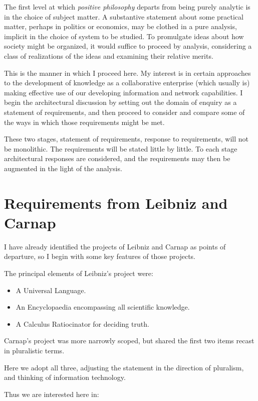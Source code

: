 The first level at which \emph{positive philosophy} departs from being
purely analytic is in the choice of subject matter.
A substantive statement about some practical matter, perhaps in
politics or economics, may be clothed in a pure analysis, implicit in
the choice of system to be studied.
To promulgate ideas about how society might be organized, it would
suffice to proceed by analysis, considering a class of realizations of
the ideas and examining their relative merits.

This is the manner in which I proceed here.
My interest is in certain approaches to the development of knowledge
as a collaborative enterprise (which usually is) making effective use
of our developing information and network capabilities.
I begin the architectural discussion by setting out the domain of
enquiry as a statement of requirements, and then proceed to consider
and compare some of the ways in which those requirements might be met.

These two stages, statement of requirements, response to requirements,
will not be monolithic.
The requirements will be stated little by little.
To each stage architectural responses are considered, and the
requirements may then be augmented in the light of the analysis.


\section{Requirements from Leibniz and Carnap}

I have already identified the projects of Leibniz and Carnap as points
of departure, so I begin with some key features of those projects.

The principal elements of Leibniz's project were:

\begin{itemize}
\item A Universal Language.
\item An Encyclopaedia encompassing all scientific knowledge.
\item A Calculus Ratiocinator for deciding truth.
\end{itemize}

Carnap's project was more narrowly scoped, but shared the first two
items recast in pluralistic terms.

Here we adopt all three, adjusting the statement in the direction of
pluralism, and thinking of information technology.

Thus we are interested here in:

